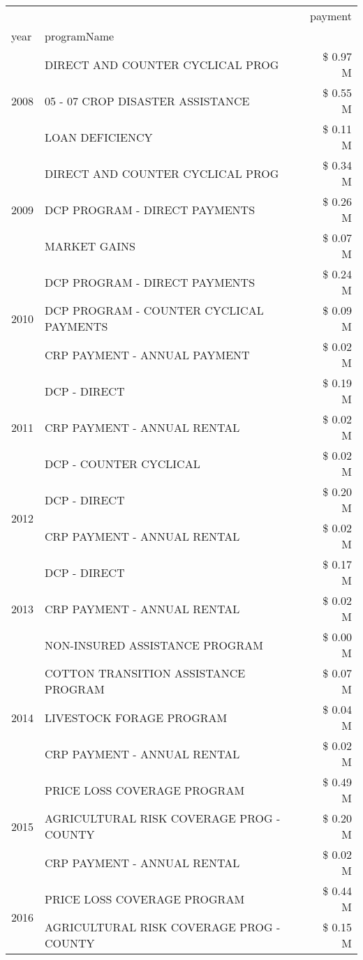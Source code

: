 \begin{tabular}{llr}
\toprule
 &  & payment \\
year & programName &  \\
\midrule
\multirow[t]{3}{*}{2008} & DIRECT AND COUNTER CYCLICAL PROG & \$ 0.97 M \\
 & 05 - 07 CROP DISASTER ASSISTANCE & \$ 0.55 M \\
 & LOAN DEFICIENCY & \$ 0.11 M \\
\cline{1-3}
\multirow[t]{3}{*}{2009} & DIRECT AND COUNTER CYCLICAL PROG & \$ 0.34 M \\
 & DCP PROGRAM - DIRECT PAYMENTS & \$ 0.26 M \\
 & MARKET GAINS & \$ 0.07 M \\
\cline{1-3}
\multirow[t]{3}{*}{2010} & DCP PROGRAM - DIRECT PAYMENTS & \$ 0.24 M \\
 & DCP PROGRAM - COUNTER CYCLICAL PAYMENTS & \$ 0.09 M \\
 & CRP PAYMENT - ANNUAL PAYMENT & \$ 0.02 M \\
\cline{1-3}
\multirow[t]{3}{*}{2011} & DCP - DIRECT & \$ 0.19 M \\
 & CRP PAYMENT - ANNUAL RENTAL & \$ 0.02 M \\
 & DCP - COUNTER CYCLICAL & \$ 0.02 M \\
\cline{1-3}
\multirow[t]{2}{*}{2012} & DCP - DIRECT & \$ 0.20 M \\
 & CRP PAYMENT - ANNUAL RENTAL & \$ 0.02 M \\
\cline{1-3}
\multirow[t]{3}{*}{2013} & DCP - DIRECT & \$ 0.17 M \\
 & CRP PAYMENT - ANNUAL RENTAL & \$ 0.02 M \\
 & NON-INSURED ASSISTANCE PROGRAM & \$ 0.00 M \\
\cline{1-3}
\multirow[t]{3}{*}{2014} & COTTON TRANSITION ASSISTANCE PROGRAM & \$ 0.07 M \\
 & LIVESTOCK FORAGE PROGRAM & \$ 0.04 M \\
 & CRP PAYMENT - ANNUAL RENTAL & \$ 0.02 M \\
\cline{1-3}
\multirow[t]{3}{*}{2015} & PRICE LOSS COVERAGE PROGRAM & \$ 0.49 M \\
 & AGRICULTURAL RISK COVERAGE PROG - COUNTY & \$ 0.20 M \\
 & CRP PAYMENT - ANNUAL RENTAL & \$ 0.02 M \\
\cline{1-3}
\multirow[t]{3}{*}{2016} & PRICE LOSS COVERAGE PROGRAM                   & \$ 0.44 M \\
 & AGRICULTURAL RISK COVERAGE PROG - COUNTY      & \$ 0.15 M \\

\end{tabular}
